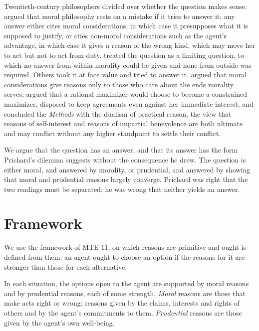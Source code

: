 \documentclass{situationist-preprint}
\begin{document}
Twentieth-century philosophers divided over whether the question makes sense. \citet{Prichard1912} argued that moral philosophy rests on a mistake if it tries to answer it: any answer either cites moral considerations, in which case it presupposes what it is supposed to justify, or cites non-moral considerations such as the agent's advantage, in which case it gives a reason of the wrong kind, which may move her to act but not to act from duty. \citet{Toulmin1950} treated the question as a limiting question, to which no answer from within morality could be given and none from outside was required. Others took it at face value and tried to answer it. \citet{Foot1972} argued that moral considerations give reasons only to those who care about the ends morality serves; \citet{Gauthier1986} argued that a rational maximizer would choose to become a constrained maximizer, disposed to keep agreements even against her immediate interest; and \citet{Sidgwick1907} concluded the \emph{Methods} with the dualism of practical reason, the view that reasons of self-interest and reasons of impartial benevolence are both ultimate and may conflict without any higher standpoint to settle their conflict.

We argue that the question has an answer, and that its answer has the form Prichard's dilemma suggests without the consequence he drew. The question is either moral, and answered by morality, or prudential, and answered by showing that moral and prudential reasons largely converge. Prichard was right that the two readings must be separated; he was wrong that neither yields an answer.

\section{Framework}

We use the framework of MTE-11, on which reasons are primitive and ought is defined from them: an agent ought to choose an option if the reasons for it are stronger than those for each alternative.

\begin{definition}\label{d:kinds}
In each situation, the options open to the agent are supported by moral reasons and by prudential reasons, each of some strength. \emph{Moral} reasons are those that make acts right or wrong: reasons given by the claims, interests and rights of others and by the agent's commitments to them. \emph{Prudential} reasons are those given by the agent's own well-being.
\end{definition}
\end{document}
